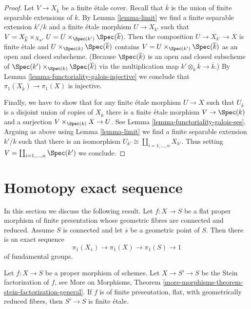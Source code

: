 \begin{proof}
\medskip\noindent
Let $V \to X_{\overline{k}}$ be a finite \'etale cover. Recall that
$\overline{k}$ is the union of finite separable extensions of $k$.
By Lemma \ref{lemma-limit} we find a finite separable extension $k'/k$
and a finite \'etale morphism $U \to X_{k'}$ such that
$V = X_{\overline{k}} \times_{X_{k'}} U =
U \times_{\Spec(k')} \Spec(\overline{k})$.
Then the composition $U \to X_{k'} \to X$ is finite \'etale
and $U \times_{\Spec(k)} \Spec(\overline{k})$
contains $V = U \times_{\Spec(k')} \Spec(\overline{k})$
as an open and closed subscheme. (Because $\Spec(\overline{k})$
is an open and closed subscheme of
$\Spec(k') \times_{\Spec(k)} \Spec(\overline{k})$ via
the multiplication map $k' \otimes_k \overline{k} \to \overline{k}$.) By
Lemma \ref{lemma-functoriality-galois-injective}
we conclude that $\pi_1(X_{\overline{k}}) \to \pi_1(X)$ is injective.

\medskip\noindent
Finally, we have to show that for any finite \'etale morphism
$U \to X$ such that $U_{\overline{k}}$ is a disjoint union
of copies of $X_{\overline{k}}$ there is a finite \'etale
morphism $V \to \Spec(k)$ and a surjection $V \times_{\Spec(k)} X \to U$.
See Lemma \ref{lemma-functoriality-galois-ses}.
Arguing as above using Lemma \ref{lemma-limit}
we find a finite separable extension $k'/k$
such that there is an isomorphism
$U_{k'} \cong \coprod_{i = 1, \ldots, n} X_{k'}$.
Thus setting $V = \coprod_{i = 1, \ldots, n} \Spec(k')$
we conclude.
\end{proof}






\section{Homotopy exact sequence}
\label{section-homotopy-exact-sequence}

\noindent
In this section we discuss the following result.
Let $f : X \to S$ be a flat proper morphism of
finite presentation whose
geometric fibres are connected and reduced.
Assume $S$ is connected and let $\overline{s}$
be a geometric point of $S$. Then there is an exact
sequence
$$
\pi_1(X_{\overline{s}}) \to \pi_1(X) \to \pi_1(S) \to 1
$$
of fundamental groups.

\begin{lemma}
\label{lemma-stein-factorization-etale}
Let $f : X \to S$ be a proper morphism of schemes.
Let $X \to S' \to S$ be the Stein factorization of $f$, see
More on Morphisms, Theorem
\ref{more-morphisms-theorem-stein-factorization-general}.
If $f$ is of finite presentation, flat, with geometrically
reduced fibres, then $S' \to S$ is finite \'etale.
\end{lemma}


